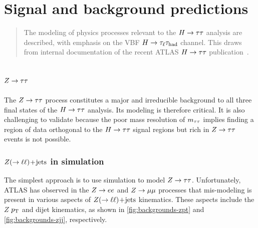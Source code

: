 \chapter[Signal and background predictions][Signal and background predictions]{Signal and background predictions}
\label{chap:backgrounds}

\begin{quote}
  The modeling of physics processes relevant to the $H\rightarrow\tau\tau$ analysis are described, with emphasis on the VBF $H\rightarrow\tau_\ell\tau_\text{had}$ channel. This draws from internal documentation of the recent ATLAS $H\rightarrow\tau\tau$ publication~\cite{ATL-COM-PHYS-2014-170}.
\end{quote}

\section{$Z\rightarrow\tau\tau$}
\label{sec:backgrounds-ztautau}

The $Z\rightarrow\tau\tau$ process constitutes a major and irreducible background to all three final states of the $H\rightarrow\tau\tau$ analysis. Its modeling is therefore critical. It is also challenging to validate because the poor mass resolution of $m_{\tau\tau}$ implies finding a region of data orthogonal to the $H\rightarrow\tau\tau$ signal regions but rich in $Z\rightarrow\tau\tau$ events is not possible.

\subsection{$Z (\rightarrow \ell\ell)\!+\!\text{jets}$ in simulation}
\label{sec:backgrounds-zjets}

The simplest approach is to use simulation to model $Z\rightarrow\tau\tau$. Unfortunately, ATLAS has observed in the $Z \rightarrow ee$ and $Z \rightarrow \mu\mu$ processes that mis-modeling is present in various aspects of $Z (\rightarrow \ell\ell)\!+\!\text{jets}$ kinematics. These aspects include the $Z$ $p_{\mathrm{T}}$ and dijet kinematics, as shown in \cref{fig:backgrounds-zpt} and \cref{fig:backgrounds-zjj}, respectively.


